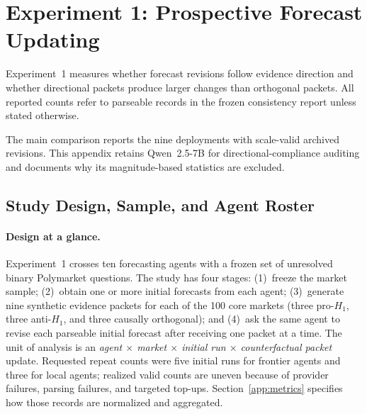 
\section{Experiment 1: Prospective Forecast Updating}
\label{app:exp1}

Experiment~1 measures whether forecast revisions follow evidence direction and
whether directional packets produce larger changes than orthogonal packets.
All reported counts refer to parseable records in the frozen consistency report
unless stated otherwise.

The main comparison reports the nine deployments with scale-valid archived
revisions. This appendix retains Qwen~2.5-7B for directional-compliance auditing
and documents why its magnitude-based statistics are excluded.

\subsection{Study Design, Sample, and Agent Roster}
\label{app:exp1-sample}

\paragraph{Design at a glance.}
Experiment~1 crosses ten forecasting agents with a frozen set of unresolved binary
Polymarket questions.  The study has four stages: (1)~freeze the market sample;
(2)~obtain one or more initial forecasts from each agent; (3)~generate nine synthetic
evidence packets for each of the 100 core markets (three pro-$H_1$, three
anti-$H_1$, and three causally orthogonal); and (4)~ask the same agent to revise each
parseable initial forecast after receiving one packet at a time.  The unit of analysis is an \emph{agent $\times$ market $\times$ initial run
$\times$ counterfactual packet} update.  Requested repeat
counts were five initial runs for frontier agents and three for local agents; realized
valid counts are uneven because of provider failures, parsing failures, and targeted
top-ups.  Section~\ref{app:metrics} specifies how those records are normalized and
aggregated.

